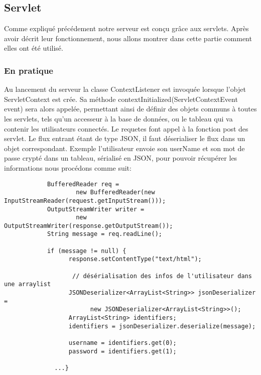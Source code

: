 
		
	
		
\subsection{Servlet}
	
		Comme expliqué précédement notre serveur est conçu grâce aux servlets. Après
		avoir décrit leur fonctionnement, nous allons montrer dans cette partie
		comment elles ont été utilisé.
		
	\subsubsection{En pratique}
		Au lancement du serveur la classe ContextListener est invoquée lorsque l'objet
		ServletContext est crée. Sa méthode contextInitialized(ServletContextEvent event) sera alors appelée, 
		permettant ainsi de définir des objets communs à toutes les
		servlets, tels qu'un accesseur à la base de données, ou le tableau qui va
		contenir les utilisateurs connectés.	
		Le requetes font appel à la fonction post des servlet. Le flux entrant étant
		de type JSON, il faut déserialiser le flux dans un objet correspondant. Exemple
		l'utilisateur envoie son userName et son mot de passe crypté dans un tableau,
		sérialisé en JSON, pour pouvoir récupérer les informations nous procédons
		comme suit: 
		
		\begin{verbatim}
			BufferedReader req = 
				    new BufferedReader(new InputStreamReader(request.getInputStream()));
			OutputStreamWriter writer = 
				    new OutputStreamWriter(response.getOutputStream());
			String message = req.readLine();
			
			if (message != null) {
				  response.setContentType("text/html");
				
				   // désérialisation des infos de l'utilisateur dans une arraylist 
				  JSONDeserializer<ArrayList<String>> jsonDeserializer = 
					    new JSONDeserializer<ArrayList<String>>();
				  ArrayList<String> identifiers;
				  identifiers = jsonDeserializer.deserialize(message);
				
				  username = identifiers.get(0);
				  password = identifiers.get(1);
				  
			  ...}
		\end{verbatim}
		

